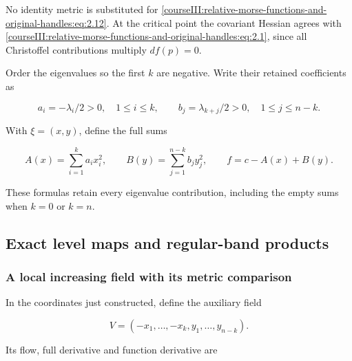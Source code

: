 No identity metric is substituted for \eqref{courseIII:relative-morse-functions-and-original-handles:eq:2.12}. At the critical point the covariant Hessian agrees with \eqref{courseIII:relative-morse-functions-and-original-handles:eq:2.1}, since all Christoffel contributions multiply \(df(p)=0\).

Order the eigenvalues so the first \(k\) are negative. Write their retained coefficients as

\begin{equation}
a_i=-\lambda_i/2>0,\quad 1\leq i\leq k,\qquad
b_j=\lambda_{k+j}/2>0,\quad1\leq j\leq n-k.
\label{courseIII:relative-morse-functions-and-original-handles:eq:2.13}
\end{equation}

With \(\xi=(x,y)\), define the full sums

\begin{equation}
A(x)=\sum_{i=1}^k a_ix_i^2,\qquad
B(y)=\sum_{j=1}^{n-k}b_jy_j^2,\qquad
f=c-A(x)+B(y).
\label{courseIII:relative-morse-functions-and-original-handles:eq:2.14}
\end{equation}

These formulas retain every eigenvalue contribution, including the empty sums when \(k=0\) or \(k=n\).

\subsection{Exact level maps and regular-band products}
\label{courseIII:relative-morse-functions-and-original-handles:relative-morse-levels}

\label{courseIII:relative-morse-functions-and-original-handles:section-3}\label{courseIII:relative-morse:3}

\subsubsection{A local increasing field with its metric comparison}
\label{courseIII:relative-morse-functions-and-original-handles:section-3.1}

In the coordinates just constructed, define the auxiliary field

\begin{equation}
V=(-x_1,\ldots,-x_k,y_1,\ldots,y_{n-k}).
\label{courseIII:relative-morse-functions-and-original-handles:eq:3.1}
\end{equation}

Its flow, full derivative and function derivative are

